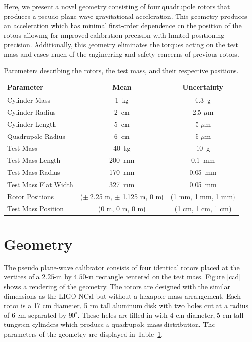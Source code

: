 \documentclass[superscriptaddress, twocolumn, prd]{revtex4-1}
\begin{document}
Here, we present a novel geometry consisting of four quadrupole rotors that produces a pseudo plane-wave gravitational acceleration. This geometry produces an acceleration which has minimal first-order dependence on the position of the rotors allowing for improved calibration precision with limited positioning precision. Additionally, this geometry eliminates the torques acting on the test mass and eases much of the engineering and safety concerns of previous rotors.

\begin{widetext}
\begingroup
\setlength{\tabcolsep}{10pt} %
\renewcommand{\arraystretch}{1.5} %

\begin{table}[h!]
\begin{center}
\begin{tabular}{ |l|c|c| }
\hline
 Parameter & Mean & Uncertainty \\
 \hline
Cylinder Mass & 1~kg & 0.3~g \\
Cylinder Radius & 2~cm & 2.5 $\mu$m \\
Cylinder Length & 5~cm & 5 $\mu$m \\
Quadrupole Radius & 6~cm & 5 $\mu$m \\
Test Mass & 40~kg & 10~g \\
Test Mass Length & 200~mm & 0.1~mm\\
Test Mass Radius & 170~mm & 0.05~mm\\
Test Mass Flat Width & 327~mm & 0.05~mm\\
Rotor Positions & ($\pm$ 2.25 m, $\pm$ 1.125 m, 0 m) & (1 mm, 1 mm, 1 mm) \\
Test Mass Position & (0 m, 0 m, 0 m) & (1 cm, 1 cm, 1 cm) \\
 \hline

 \end{tabular}
 \caption{Parameters describing the rotors, the test mass, and their respective positions.}\label{param}
 \end{center}

\end{table}
\endgroup
\end{widetext}

\section{Geometry}

The pseudo plane-wave calibrator consists of four identical rotors placed at the vertices of a $2.25$-m by $4.50$-m rectangle centered on the test mass. Figure \ref{cad} shows a rendering of the geometry. The rotors are designed with the similar dimensions as the LIGO NCal \cite{ncal} but without a hexapole mass arrangement. Each rotor is a 17 cm diameter, 5 cm tall aluminum disk with two holes cut at a radius of 6 cm separated by $90^\circ$. These holes are filled in with 4 cm diameter, 5 cm tall  tungsten cylinders which produce a quadrupole mass distribution. The parameters of the geometry are displayed in Table~\ref{param}.
\end{document}
